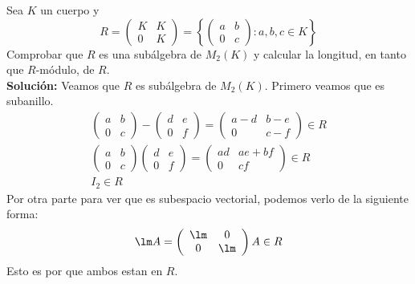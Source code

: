 \begin{ejerciciostar}
    Sea $K$ un cuerpo y 
    \begin{equation*}
        R = \left(\begin{array}{cc}
            K & K \\
            0 & K 
        \end{array}\right) = \left\{\left(\begin{array}{cc}
            a & b \\
            0 & c  
        \end{array}\right): a, b, c \in K\right\}
    \end{equation*}
    Comprobar que $R$ es una subálgebra de $M_2(K)$ y calcular la longitud, en tanto que $R$-módulo, de $R$. \\
    
    \noindent
    \textbf{Solución:}
    Veamos que $R$ es subálgebra de $M_2(K)$. Primero veamos que es subanillo.
    \begin{gather*}
        \left(\begin{array}{cc}
            a & b \\
            0 & c  
        \end{array}\right) 
        - \left(\begin{array}{cc}
            d & e \\
            0  & f 
        \end{array}\right) 
        = \left(\begin{array}{cc}
            a-d & b-e \\
            0 & c-f 
        \end{array}\right) \in R \\
        \left(\begin{array}{cc}
            a & b \\
            0 & c  
        \end{array}\right) 
        \left(\begin{array}{cc}
            d & e \\
            0  & f 
        \end{array}\right) 
        = \left(\begin{array}{cc}
            ad & ae + bf \\
            0 & cf 
        \end{array}\right) \in R\\ 
        I_2 \in R
    \end{gather*}
    Por otra parte para ver que es subespacio vectorial, podemos verlo de la siguiente forma:
    \begin{equation*}
        \lm A = \left(\begin{array}{cc}
            \lm & 0 \\
            0 & \lm 
        \end{array}\right) A \in R
    \end{equation*}
    Esto es por que ambos estan en $R$. \\


\end{ejerciciostar}
